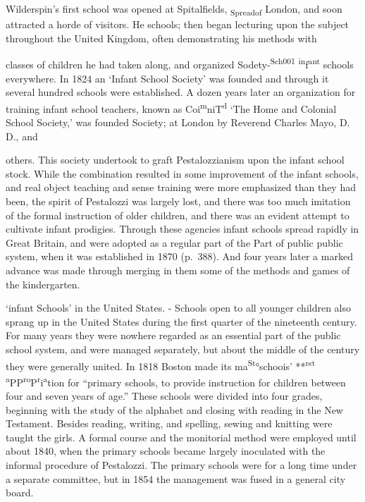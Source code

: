 \documentclass[
]{book}
\begin{document}
Wilderspin's first school was opened at Spitalfields, \textsubscript{Spreadof} London, and soon attracted a horde of visitors. He schools; then began lecturing upon the subject throughout the United Kingdom, often demonstrating his methods with

classes of children he had taken along, and organized Sodety-\textsuperscript{Sch001} \textsuperscript{in}f\textsuperscript{ant} schools everywhere. In 1824 an `Infant School Society' was founded and through it several hundred schools were established. A dozen years later an organization for training infant school teachers, known as Coi\textsuperscript{m}niT\textsuperscript{d} `The Home and Colonial School Society,' was founded Society; at London by Reverend Charles Mayo, D. D., and

others. This society undertook to graft Pestalozzianism upon the infant school stock. While the combination resulted in some improvement of the infant schools, and real object teaching and sense training were more emphasized than they had been, the spirit of Pestalozzi was largely lost, and there was too much imitation of the formal instruction of older children, and there was an evident attempt to cultivate infant prodigies. Through these agencies infant schools spread rapidly in Great Britain, and were adopted as a regular part of the Part of public public system, when it was established in 1870 (p.~388). And four years later a marked advance was made through merging in them some of the methods and games of the kindergarten.

`infant Schools' in the United States. - Schools open to all younger children also sprang up in the United States during the first quarter of the nineteenth century. For many years they were nowhere regarded as an essential part of the public school system, and were managed separately, but about the middle of the century they were generally united. In 1818 Boston made its ma\textsuperscript{St}°schoois' **\textsuperscript{rst} \textsuperscript{a}PP\textsuperscript{ro}P\textsuperscript{r}i\textsuperscript{a}tion for ``primary schools, to provide instruction for children between four and seven years of age.'' These schools were divided into four grades, beginning with the study of the alphabet and closing\protect\hypertarget{ch20.xmlux5cux23para.308.1.0.box.122.232.1048.422.q.70}{}{ with reading in the New Testament. Besides reading, writing, and spelling, sewing and knitting were taught the girls. A formal course and the monitorial method were employed until about 1840, when the primary schools became largely inoculated with the informal procedure of Pestalozzi. The primary schools were for a long time under a separate committee, but in 1854 the management was fused in a general city board.}
\end{document}
